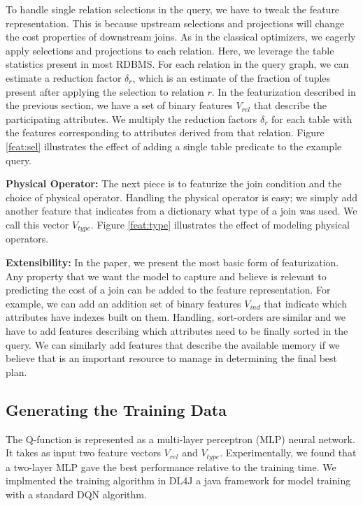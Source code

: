 To handle single relation selections in the query, we have to tweak the feature representation. This is because upstream selections and projections will change the cost properties of downstream joins. As in the classical optimizers, we eagerly apply selections and projections to each relation. 
Here, we leverage the table statistics present in most RDBMS. For each relation in the query graph, we can estimate a reduction factor $\delta_{r}$, which is an estimate of the fraction of tuples present after applying the selection to relation $r$. 
In the featurization described in the previous section, we have a set of binary features $V_{rel}$ that describe the participating attributes.
We multiply the reduction factors $\delta_r$ for each table with the features corresponding to attributes derived from that relation.
Figure \ref{feat:sel} illustrates the effect of adding a single table predicate to the example query. 

\vspace{0.5em} \noindent \textbf{Physical Operator: } The next piece is to featurize the join condition and the choice of physical operator. Handling the physical operator is easy; we simply add another feature that indicates from a dictionary what type of a join was used. We call this vector $V_{type}$. Figure \ref{feat:type} illustrates the effect of modeling physical operators. 

\vspace{0.5em} \noindent \textbf{Extensibility: } In the paper, we present the most basic form of featurization. Any property that we want the model to capture and believe is relevant to predicting the cost of a join can be added to the feature representation.  For example, we can add an addition set of binary features $V_{ind}$ that indicate which attributes have indexes built on them. Handling, sort-orders are similar and we have to add features describing which attributes need to be finally sorted in the query. We can similarly add features that describe the available memory if we believe that is an important resource to manage in determining the final best plan.

\subsection{Generating the Training Data}
The Q-function is represented as a multi-layer perceptron (MLP) neural network.
It takes as input two feature vectors $V_{rel}$ and $V_{type}$. Experimentally, we found that a two-layer MLP gave the best performance relative to the training time. We implmented the training algorithm in \textsf{DL4J} a java framework for model training with a standard DQN algorithm. 

